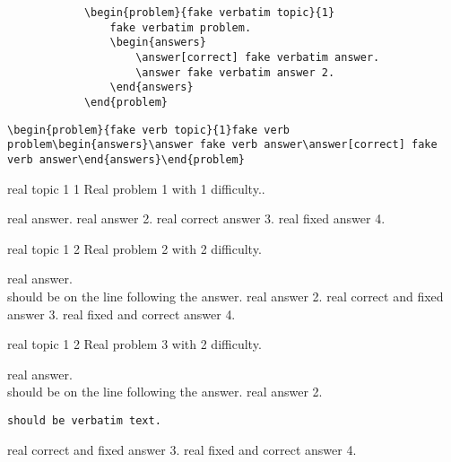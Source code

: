 \documentclass[master]{exam}
\begin{document}
	
	
	
	\begin{verbatim}
			\begin{problem}{fake verbatim topic}{1}
				fake verbatim problem.
				\begin{answers}
					\answer[correct] fake verbatim answer.
					\answer fake verbatim answer 2.
				\end{answers}
			\end{problem}
	\end{verbatim}
	
	
	\verb!\begin{problem}{fake verb topic}{1}fake verb problem\begin{answers}\answer fake verb answer\answer[correct] fake verb answer\end{answers}\end{problem}!
	
	
	\begin{problem}{  real topic 1  }{1}
		Real problem 1  with 1 difficulty..
		\begin{answers}
			\answer real answer.
			\answer real answer 2.
			\answer[correct] real correct answer 3.
			\answer[fixed] real fixed answer 4.
		\end{answers}
	\end{problem}
	
	\begin{problem}{  real topic 1  }{2}
		Real problem 2 with 2 difficulty.
		\begin{answers}
			\answer real answer. \\ should be on the line following the answer.
			\answer real answer 2.
			 real correct and fixed answer 3.
			 real fixed and correct answer 4.
		\end{answers}
	\end{problem}
	
	\begin{problem}{  real topic 1  }{2}
		Real problem 3 with 2 difficulty.
		\begin{answers}
			\answer real answer. \\ should be on the line following the answer.
			\answer real answer 2.\begin{verbatim}should be verbatim text. \end{verbatim}
			 real correct and fixed answer 3.
			 real fixed and correct answer 4.
		\end{answers}
	\end{problem}
	
\end{document}
